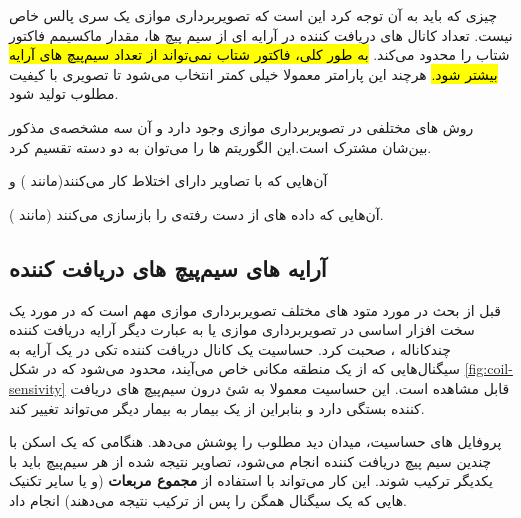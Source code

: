 چیزی که باید به آن توجه کرد این است که تصویربرداری موازی یک سری پالس خاص نیست.
تعداد کانال های دریافت کننده در آرایه ای از سیم پیچ ها، مقدار ماکسیمم فاکتور شتاب را محدود می‌کند.
\hl{به طور کلی، فاکتور شتاب نمی‌تواند از تعداد سیم‌پیچ های آرایه بیشتر شود. }
هرچند این پارامتر معمولا خیلی کمتر انتخاب می‌شود تا تصویری با کیفیت مطلوب تولید شود.

روش های مختلفی در تصویربرداری موازی وجود دارد و آن سه مشخصه‌ی مذکور بین‌شان مشترک است.این الگوریتم ها را می‌توان به دو دسته تقسیم کرد.
\begin{enuminline}
	\item آن‌هایی که با تصاویر دارای اختلاط  کار می‌کنند(مانند )	
	و 
	\item
	 آن‌هایی که داده های از دست رفته‌ی \kspace را بازسازی می‌کنند (مانند ).
\end{enuminline}

\subsection{آرایه های سیم‌پیچ های دریافت کننده}


قبل از بحث در مورد متود های مختلف تصویربرداری موازی مهم است که در مورد یک سخت افزار اساسی در تصویربرداری موازی یا به عبارت دیگر آرایه دریافت کننده چندکاناله
،
صحبت کرد.
حساسیت یک کانال دریافت کننده تکی در یک آرایه به سیگنال‌هایی که از یک منطقه مکانی خاص می‌آیند، محدود می‌شود که
در شکل \ref{fig:coil-sensivity}
قابل مشاهده است. این حساسیت معمولا به شئ درون سیم‌پیچ های دریافت کننده بستگی دارد و بنابراین از یک بیمار به بیمار دیگر می‌تواند تغییر کند. 

\begin{figure}[t!]
	\centering
	\removevspace[1]
	\caption{}
	\label{fig:coil-sensivity-direction}
\end{figure}

پروفایل های حساسیت، میدان دید مطلوب را پوشش می‌دهد. هنگامی که یک اسکن با چندین سیم پیچ دریافت کننده انجام می‌شود، تصاویر نتیجه شده از هر سیم‌پیچ باید با یکدیگر ترکیب شوند. این کار می‌تواند با استفاده از \textbf{مجموع مربعات} (و یا سایر تکنیک هایی که یک سیگنال همگن را پس از ترکیب نتیجه می‌دهند) انجام داد.


